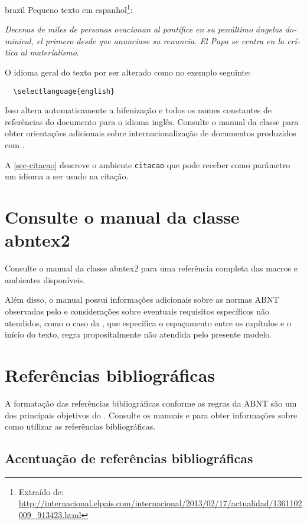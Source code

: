 \begin{otherlanguage*}{brazil}
Pequeno texto em espanhol\footnote{Extraído de:
\url{http://internacional.elpais.com/internacional/2013/02/17/actualidad/1361102009_913423.html}}:

\foreignlanguage{spanish}{\textit{Decenas de miles de personas ovacionan al pontífice en su
penúltimo ángelus dominical, el primero desde que anunciase su renuncia. El Papa se
centra en la crítica al materialismo}}.

O idioma geral do texto por ser alterado como no exemplo seguinte:

\begin{verbatim}
  \selectlanguage{english}
\end{verbatim}

Isso altera automaticamente a hifenização e todos os nomes constantes de
referências do documento para o idioma inglês. Consulte o manual da classe
\cite{abntex2classe} para obter orientações adicionais sobre internacionalização de
documentos produzidos com \abnTeX{}.

A \autoref{sec-citacao} descreve o ambiente \texttt{citacao} que pode receber
como parâmetro um idioma a ser usado na citação.

\section{Consulte o manual da classe \textsf{abntex2}}

Consulte o manual da classe \textsf{abntex2} \cite{abntex2classe} para uma
referência completa das macros e ambientes disponíveis.

Além disso, o manual possui informações adicionais sobre as normas ABNT
observadas pelo \abnTeX{} e considerações sobre eventuais requisitos específicos
não atendidos, como o caso da \textcite[seção 5.2.2]{NBR14724:2011}, que
especifica o espaçamento entre os capítulos e o início do texto, regra
propositalmente não atendida pelo presente modelo.

\section{Referências bibliográficas}

A formatação das referências bibliográficas conforme as regras da ABNT são um
dos principais objetivos do \abnTeX{}. Consulte os manuais
\textcite{abntex2cite} e \textcite{abntex2cite-alf} para obter informações
sobre como utilizar as referências bibliográficas.

\subsection{Acentuação de referências bibliográficas}


\end{otherlanguage*}
